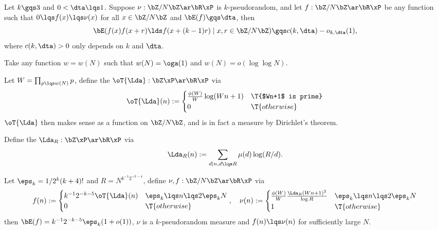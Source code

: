 \documentclass[article, a4paper, twoside]{universal}
\begin{document}
\begin{thm}\label{thm:Szemeredi}
    Let $k\gqs3$ and $0<\dta\lqs1$. Suppose $\nu:\bZ/N\bZ\ar\bR\xP$ is $k$-pseudorandom, and let $f:\bZ/N\bZ\ar\bR\xP$ be any function such that $0\lqs f(x)\lqs \nu(x)$ for all $x\in\bZ/N\bZ$ and $\bE(f)\gqs\dta$, then
    \[
        \bE(f(x)f(x+r)\lds f(x+(k-1)r)\mid x,r\in\bZ/N\bZ)\gqs c(k,\dta)-o_{k,\dta}(1),
    \]
    where $c(k,\dta)>0$ only depends on $k$ and $\dta$.
\end{thm}


\begin{stp}
    Take any function $w=w(N)$ such that $w(N)=\oga(1)$ and $w(N)=o(\log\log N)$.
\end{stp}

\begin{dfn}
    Let $W=\prod_{p\lqs w(N)}p$, define the  $\oT{\Lda}:\bZ\xP\ar\bR\xP$ via
    \[
        \oT{\Lda}(n):=\begin{cases}
          \frac{\phi(W)}{W}\log(Wn+1) & \T{$Wn+1$ is prime} \\
          0 & \T{otherwise}            
        \end{cases}
    \]
    $\oT{\Lda}$ then makes sense as a function on $\bZ/N\bZ$, and is in fact a measure by Dirichlet's theorem.
\end{dfn}

\begin{dfn}
    Define the  $\Lda_{R}:\bZ\xP\ar\bR\xP$ via
    \[
        \Lda_{R}(n):=\sum_{d\mid n, d\lqs R}\mu(d)\log(R/d).
    \]
\end{dfn}

\begin{thm}\label{thm:GoldstonYidirim}
    Let $\eps_{k}=1/2^{k}(k+4)!$ and $R=N^{k^{-1}2^{-k-4}}$, define $\nu,f:\bZ/N\bZ\ar\bR\xP$ via
    \[
        f(n):=\begin{cases}
          k^{-1}2^{-k-5}\oT{\Lda}(n) & \eps_{k}\lqs n\lqs 2\eps_{k}N \\
          0 & \T{otherwise}
        \end{cases},\quad \nu(n):=\begin{cases}
          \frac{\phi(W)}{W}\frac{\Lda_{R}(Wn+1)^{2}}{\log R} & \eps_{k}\lqs n\lqs 2\eps_{k}N \\
          1 & \T{otherwise}
        \end{cases}
    \]
    then $\bE(f)=k^{-1}2^{-k-5}\eps_{k}(1+o(1))$, $\nu$ is a $k$-pseudorandom measure and $f(n)\lqs\nu(n)$ for sufficiently large $N$.
\end{thm}
\end{document}
